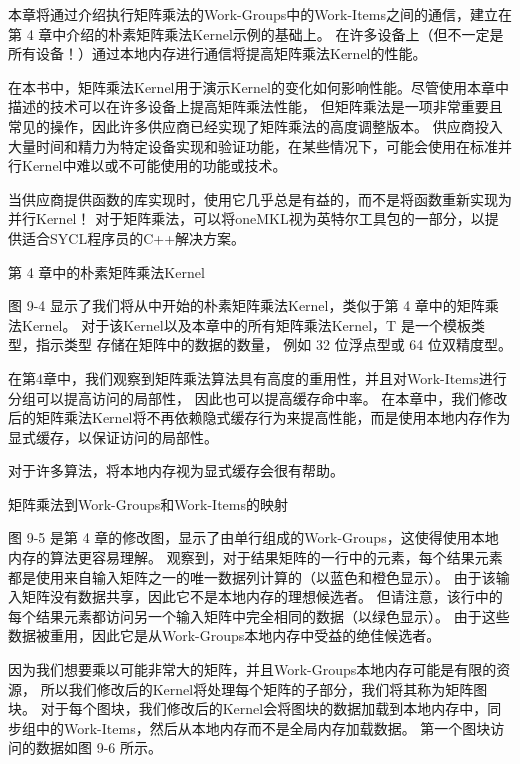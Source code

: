 本章将通过介绍执行矩阵乘法的Work-Groups中的Work-Items之间的通信，建立在第 4 章中介绍的朴素矩阵乘法Kernel示例的基础上。 
在许多设备上（但不一定是所有设备！）通过本地内存进行通信将提高矩阵乘法Kernel的性能。

\begin{remark}[关于矩阵乘法的说明]
在本书中，矩阵乘法Kernel用于演示Kernel的变化如何影响性能。尽管使用本章中描述的技术可以在许多设备上提高矩阵乘法性能，
但矩阵乘法是一项非常重要且常见的操作，因此许多供应商已经实现了矩阵乘法的高度调整版本。
供应商投入大量时间和精力为特定设备实现和验证功能，在某些情况下，可能会使用在标准并行Kernel中难以或不可能使用的功能或技术。
\end{remark}

\begin{remark}[使用供应商提供的库！]
当供应商提供函数的库实现时，使用它几乎总是有益的，而不是将函数重新实现为并行Kernel！
对于矩阵乘法，可以将oneMKL视为英特尔工具包的一部分，以提供适合SYCL程序员的C++解决方案。
\end{remark}

{\color{red} 第 4 章中的朴素矩阵乘法Kernel}

图 9-4 显示了我们将从中开始的朴素矩阵乘法Kernel，类似于第 4 章中的矩阵乘法Kernel。
对于该Kernel以及本章中的所有矩阵乘法Kernel，T 是一个模板类型，指示类型 存储在矩阵中的数据的数量，
例如 32 位浮点型或 64 位双精度型。

在第4章中，我们观察到矩阵乘法算法具有高度的重用性，并且对Work-Items进行分组可以提高访问的局部性，
因此也可以提高缓存命中率。 
在本章中，我们修改后的矩阵乘法Kernel将不再依赖隐式缓存行为来提高性能，而是使用本地内存作为显式缓存，以保证访问的局部性。

\begin{remark}
	对于许多算法，将本地内存视为显式缓存会很有帮助。
\end{remark}

{\color{red} 矩阵乘法到Work-Groups和Work-Items的映射}

图 9-5 是第 4 章的修改图，显示了由单行组成的Work-Groups，这使得使用本地内存的算法更容易理解。 
观察到，对于结果矩阵的一行中的元素，每个结果元素都是使用来自输入矩阵之一的唯一数据列计算的（以蓝色和橙色显示）。 
由于该输入矩阵没有数据共享，因此它不是本地内存的理想候选者。 
但请注意，该行中的每个结果元素都访问另一个输入矩阵中完全相同的数据（以绿色显示）。 
由于这些数据被重用，因此它是从Work-Groups本地内存中受益的绝佳候选者。

因为我们想要乘以可能非常大的矩阵，并且Work-Groups本地内存可能是有限的资源，
所以我们修改后的Kernel将处理每个矩阵的子部分，我们将其称为矩阵图块。 
对于每个图块，我们修改后的Kernel会将图块的数据加载到本地内存中，同步组中的Work-Items，然后从本地内存而不是全局内存加载数据。 
第一个图块访问的数据如图 9-6 所示。

